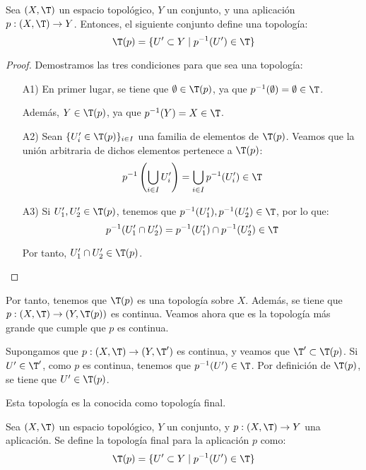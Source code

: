 \begin{prop}
    Sea $(X,\T)$ un espacio topológico, $Y$ un conjunto, y una aplicación $p:(X,\T)\to Y$. Entonces, el siguiente conjunto define una topología:
    \begin{equation*}
        \T(p) = \{U'\subset Y\mid p^{-1}(U')\in \T\}
    \end{equation*}
\end{prop}
\begin{proof} Demostramos las tres condiciones para que sea una topología:
    \begin{enumerate}
        \item[A1)] En primer lugar, se tiene que $\emptyset\in \T(p)$, ya que $p^{-1}(\emptyset)=\emptyset\in \T$.
    
        Además, $Y\in \T(p)$, ya que $p^{-1}(Y)=X\in \T$.
    
        \item[A2)] Sean $\{U_i'\in \T(p)\}_{i\in I}$ una familia de elementos de $\T(p)$. Veamos que la unión arbitraria de dichos elementos pertenece a $\T(p)$:
        \begin{equation*}
            p^{-1}\left(\bigcup_{i\in I}U_i'\right) = \bigcup_{i\in I}p^{-1}(U_i') \in \T
        \end{equation*}
    
        \item[A3)] Si $U_1', U_2'\in \T(p)$, tenemos que $p^{-1}(U_1'),p^{-1}(U_2')\in \T$, por lo que:
        \begin{equation*}
            p^{-1}(U'_1\cap U_2') = p^{-1}(U_1')\cap p^{-1}(U_2') \in \T
        \end{equation*}
    
        Por tanto, $U'_1\cap U_2'\in \T(p)$.
    \end{enumerate}
\end{proof}

Por tanto, tenemos que $\T(p)$ es una topología sobre $X$. Además, se tiene que $p:(X,\T)\to (Y,\T(p))$ es continua. Veamos ahora que es la topología más grande que cumple que $p$ es continua.

Supongamos que $p:(X,\T)\to (Y,\T')$ es continua, y veamos que $\T'\subset \T(p)$. Si $U'\in \T'$, como $p$ es continua, tenemos que $p^{-1}(U')\in \T$. Por definición de $\T(p)$, se tiene que $U'\in \T(p)$.

Esta topología es la conocida como topología final.

\begin{definicion}
    Sea $(X,\T)$ un espacio topológico, $Y$ un conjunto, y $p:(X,\T)\to Y$ una aplicación. Se define la topología final para la aplicación $p$ como:
    \begin{equation*}
        \T(p) = \{U'\subset Y\mid p^{-1}(U')\in \T\}
    \end{equation*}
\end{definicion}

